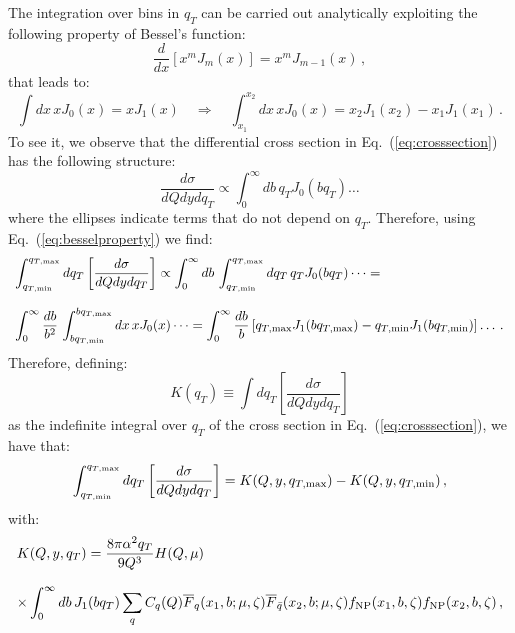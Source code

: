\documentclass[10pt,a4paper]{article}
\begin{document}
The integration over bins in $q_T$ can be carried out analytically
exploiting the following property of Bessel's function:
\begin{equation}
\frac{d}{dx}\left[x^mJ_m(x)\right]=x^mJ_{m-1}(x)\,,
\end{equation}
that leads to:
\begin{equation}\label{eq:besselproperty}
\int dx\,x J_0(x) = xJ_1(x)\quad\Rightarrow\quad \int_{x_1}^{x_2}
dx\,x J_0(x) = x_2J_1(x_2) - x_1J_1(x_1)\,.
\end{equation}
To see it, we observe that the differential cross section in
Eq.~(\ref{eq:crosssection}) has the following structure:
\begin{equation}
  \frac{d\sigma}{dQ dy dq_T} \propto \int_0^\infty db\, q_T  J_0(bq_T)\dots
\end{equation}
where the ellipses indicate terms that do not depend on
$q_T$. Therefore, using Eq.~(\ref{eq:besselproperty}) we find:
\begin{equation}
\begin{array}{l}
\displaystyle \int_{q_{T,\rm min}}^{q_{T,\rm
  max}}dq_T\left[\frac{d\sigma}{dQ dy dq_T} \right] \propto \int_0^\infty db\,
  \int_{q_{T,\rm min}}^{q_{T,\rm
  max}} dq_T\,   q_T J_0(bq_T)\dots= \\
\\
\displaystyle \int_0^\infty \frac{db}{b^2}\,
  \int_{bq_{T,\rm min}}^{bq_{T,\rm
  max}} dx\,   x J_0(x)\dots=\int_0^\infty \frac{db}{b}\left[q_{T,\rm
  max}J_1(bq_{T,\rm max}) - q_{T,\rm
  min}J_1(bq_{T,\rm min})\right]\dots\,.
\end{array}
\end{equation}
Therefore, defining:
\begin{equation}
K(q_T) \equiv \int dq_T\left[\frac{d\sigma}{dQ dy dq_T} \right]
\end{equation}
as the indefinite integral over $q_T$ of the cross section in
Eq.~(\ref{eq:crosssection}), we have that:
\begin{equation}\label{eq:primitive}
\int_{q_{T,\rm min}}^{q_{T,\rm
  max}}dq_T\left[\frac{d\sigma}{dQ dy dq_T} \right] = K(Q,y,q_{T,\rm max})
- K(Q,y,q_{T,\rm min})\,,
\end{equation}
with:
\begin{equation}\label{eq:Kexplicit}
\begin{array}{l}
 \displaystyle K(Q,y,q_T) =
  \frac{8\pi\alpha^2q_T}{9 Q^3} H(Q,\mu) \\
\\
\displaystyle \times
  \int_0^\infty db\, J_1(bq_T) \sum_q C_q(Q)\overline{F}_q(x_1,b;\mu,\zeta) \overline{F}_{\bar{q}}(x_2,b;\mu,\zeta) f_{\rm NP}(x_1,b,\zeta)
  f_{\rm NP}(x_2,b,\zeta)\,,
\end{array}
\end{equation}
\end{document}
